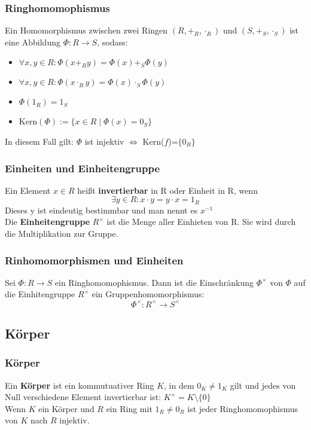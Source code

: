 \documentclass{kit}
\begin{document}
    \subsubsection{Ringhomomophismus}
      Ein Homomorphismus zwischen zwei Ringen $(R,+_R,\cdot_R)$ und $(S,+_S,\cdot_S)$ ist eine Abbildung $\Phi:R\longrightarrow S$, sodass:
      \begin{itemize}
        \item $\forall x,y\in R:\Phi(x+_Ry)=\Phi(x)+_S\Phi(y)$
        \item $\forall x,y\in R:\Phi(x\cdot_Ry)=\Phi(x)\cdot_S\Phi(y)$
        \item $\Phi(1_R)=1_S$
        \item Kern$(\Phi):=\{x\in R\mid \Phi(x)=0_S\}$
      \end{itemize}
      In diesem Fall gilt: $\Phi$ ist injektiv $\Leftrightarrow$ Kern($f$)=$\{0_R\}$
    \subsubsection{Einheiten und Einheitengruppe}
      Ein Element $x\in R$ heißt \textbf{invertierbar} in R oder Einheit in R, wenn
      $$\exists y\in R:x\cdot y=y\cdot x=1_R$$
      Dieses y ist eindeutig bestimmbar und man nennt es $x^{-1}$\\
      Die \textbf{Einheitengruppe} $R^\times$ ist die Menge aller Einhieten von R. Sie wird durch die Multiplikation zur Gruppe.
    \subsubsection{Rinhomomorphismen und Einheiten}
      Sei $\Phi:R\longrightarrow S$ ein Ringhomomophismus. Dann ist die Einschränkung $\Phi^\times$ von $\Phi$ auf die Einhitengruppe 
      $R^\times$ ein Gruppenhomomorphismus:
      $$\Phi^\times:R^\times\longrightarrow S^\times$$
  \subsection{Körper}
    \subsubsection{Körper}
      Ein \textbf{Körper} ist ein kommutuativer Ring $K$, in dem $0_K\neq 1_K$ gilt und jedes von Null verschiedene Element invertierbar ist: 
      $K^\times=K\setminus\{0\}$\\
      Wenn $K$ ein Körper und $R$ ein Ring mit $1_R\neq 0_R$ ist jeder Ringhomomophismus von $K$ nach $R$ injektiv.
\end{document}
